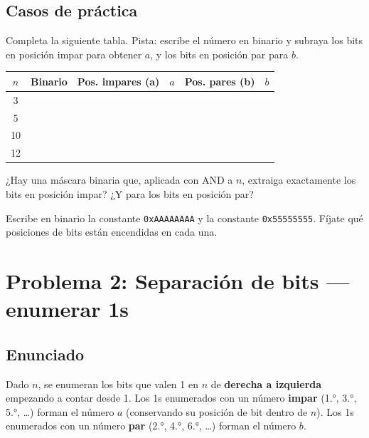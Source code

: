 \documentclass[12pt, oneside]{article}
\begin{document}
\subsection{Casos de práctica}

Completa la siguiente tabla. Pista: escribe el número en binario y subraya
los bits en posición impar para obtener $a$, y los bits en posición par para $b$.

\begin{center}
\begin{tabular}{cccccc}
  \toprule
  $n$ & \textbf{Binario} & \textbf{Pos. impares (a)} & $a$ & \textbf{Pos. pares (b)} & $b$ \\
  \midrule
   3  & & & & & \\[6pt]
   5  & & & & & \\[6pt]
  10  & & & & & \\[6pt]
  12  & & & & & \\[6pt]
  \bottomrule
\end{tabular}
\end{center}

\vspace{0.5cm}

¿Hay una máscara binaria que, aplicada con AND a $n$, extraiga exactamente los
bits en posición impar?  ¿Y para los bits en posición par?

\vspace{2cm}

\begin{consejo}
  Escribe en binario la constante \texttt{0xAAAAAAAA} y la constante
  \texttt{0x55555555}.  Fíjate qué posiciones de bits están encendidas en cada
  una.
\end{consejo}

\newpage

\section{Problema 2: Separación de bits — enumerar 1s}

\subsection{Enunciado}

Dado $n$, se enumeran los bits que valen 1 en $n$ de \textbf{derecha a izquierda}
empezando a contar desde 1.  Los 1s enumerados con un número \textbf{impar}
(1.°, 3.°, 5.°, \ldots) forman el número $a$ (conservando su posición de bit
dentro de $n$).  Los 1s enumerados con un número \textbf{par} (2.°, 4.°, 6.°,
\ldots) forman el número $b$.
\end{document}
